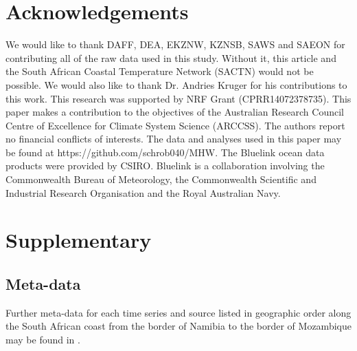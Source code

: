 \documentclass[a4paper,10pt,review]{elsarticle}
\begin{document}
\section*{Acknowledgements}
We would like to thank DAFF, DEA, EKZNW, KZNSB, SAWS and SAEON for contributing all of the raw data used in this study. Without it, this article and the South African Coastal Temperature Network (SACTN) would not be possible. We would also like to thank Dr. Andries Kruger for his contributions to this work. This research was supported by NRF Grant (CPRR14072378735). This paper makes a contribution to the objectives of the Australian Research Council Centre of Excellence for Climate System Science (ARCCSS). The authors report no financial conflicts of interests. The data and analyses used in this paper may be found at https://github.com/schrob040/MHW. The Bluelink ocean data products were provided by CSIRO. Bluelink is a collaboration involving the Commonwealth Bureau of Meteorology, the Commonwealth Scientific and Industrial Research Organisation and the Royal Australian Navy.

\section*{Supplementary}
\subsection*{Meta-data}
Further meta-data for each time series and source listed in geographic order along the South African coast from the border of Namibia to the border of Mozambique may be found in .
\end{document}
